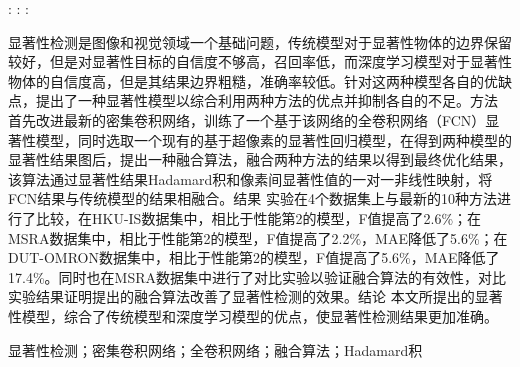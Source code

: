 \documentclass[]{my}
\begin{document}
    :  :   :

    \begin{center}
    \end{center}

    \begin{cabstract}
        显著性检测是图像和视觉领域一个基础问题，传统模型对于显著性物体的边界保留较好，但是对显著性目标的自信度不够高，召回率低，而深度学习模型对于显著性物体的自信度高，但是其结果边界粗糙，准确率较低。针对这两种模型各自的优缺点，提出了一种显著性模型以综合利用两种方法的优点并抑制各自的不足。方法 首先改进最新的密集卷积网络，训练了一个基于该网络的全卷积网络（FCN）显著性模型，同时选取一个现有的基于超像素的显著性回归模型，在得到两种模型的显著性结果图后，提出一种融合算法，融合两种方法的结果以得到最终优化结果，该算法通过显著性结果Hadamard积和像素间显著性值的一对一非线性映射，将FCN结果与传统模型的结果相融合。结果 实验在4个数据集上与最新的10种方法进行了比较，在HKU-IS数据集中，相比于性能第2的模型，F值提高了2.6\%；在MSRA数据集中，相比于性能第2的模型，F值提高了2.2\%，MAE降低了5.6\%；在DUT-OMRON数据集中，相比于性能第2的模型，F值提高了5.6\%，MAE降低了17.4\%。同时也在MSRA数据集中进行了对比实验以验证融合算法的有效性，对比实验结果证明提出的融合算法改善了显著性检测的效果。结论 本文所提出的显著性模型，综合了传统模型和深度学习模型的优点，使显著性检测结果更加准确。
    \end{cabstract}


    \begin{ckeywords}
        显著性检测；密集卷积网络；全卷积网络；融合算法；Hadamard积
    \end{ckeywords}   

    \clearpage
  
    
\end{document}
